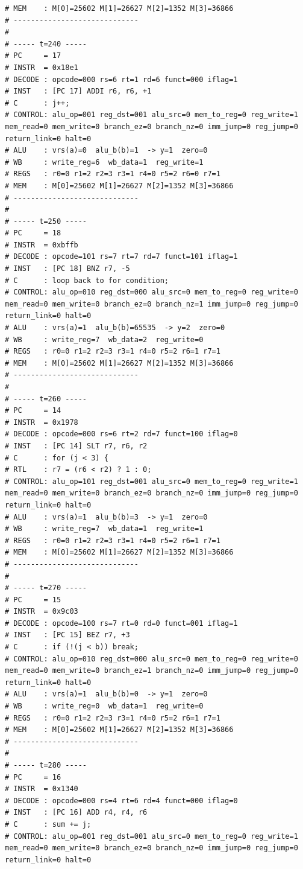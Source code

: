 \documentclass[12pt]{report}
\begin{document}
\begin{lstlisting}
# MEM    : M[0]=25602 M[1]=26627 M[2]=1352 M[3]=36866
# -----------------------------
# 
# ----- t=240 -----
# PC     = 17
# INSTR  = 0x18e1
# DECODE : opcode=000 rs=6 rt=1 rd=6 funct=000 iflag=1
# INST   : [PC 17] ADDI r6, r6, +1
# C      : j++;
# CONTROL: alu_op=001 reg_dst=001 alu_src=0 mem_to_reg=0 reg_write=1 mem_read=0 mem_write=0 branch_ez=0 branch_nz=0 imm_jump=0 reg_jump=0 return_link=0 halt=0
# ALU    : vrs(a)=0  alu_b(b)=1  -> y=1  zero=0
# WB     : write_reg=6  wb_data=1  reg_write=1
# REGS   : r0=0 r1=2 r2=3 r3=1 r4=0 r5=2 r6=0 r7=1
# MEM    : M[0]=25602 M[1]=26627 M[2]=1352 M[3]=36866
# -----------------------------
# 
# ----- t=250 -----
# PC     = 18
# INSTR  = 0xbffb
# DECODE : opcode=101 rs=7 rt=7 rd=7 funct=101 iflag=1
# INST   : [PC 18] BNZ r7, -5
# C      : loop back to for condition;
# CONTROL: alu_op=010 reg_dst=000 alu_src=0 mem_to_reg=0 reg_write=0 mem_read=0 mem_write=0 branch_ez=0 branch_nz=1 imm_jump=0 reg_jump=0 return_link=0 halt=0
# ALU    : vrs(a)=1  alu_b(b)=65535  -> y=2  zero=0
# WB     : write_reg=7  wb_data=2  reg_write=0
# REGS   : r0=0 r1=2 r2=3 r3=1 r4=0 r5=2 r6=1 r7=1
# MEM    : M[0]=25602 M[1]=26627 M[2]=1352 M[3]=36866
# -----------------------------
# 
# ----- t=260 -----
# PC     = 14
# INSTR  = 0x1978
# DECODE : opcode=000 rs=6 rt=2 rd=7 funct=100 iflag=0
# INST   : [PC 14] SLT r7, r6, r2
# C      : for (j < 3) {
# RTL    : r7 = (r6 < r2) ? 1 : 0;
# CONTROL: alu_op=101 reg_dst=001 alu_src=0 mem_to_reg=0 reg_write=1 mem_read=0 mem_write=0 branch_ez=0 branch_nz=0 imm_jump=0 reg_jump=0 return_link=0 halt=0
# ALU    : vrs(a)=1  alu_b(b)=3  -> y=1  zero=0
# WB     : write_reg=7  wb_data=1  reg_write=1
# REGS   : r0=0 r1=2 r2=3 r3=1 r4=0 r5=2 r6=1 r7=1
# MEM    : M[0]=25602 M[1]=26627 M[2]=1352 M[3]=36866
# -----------------------------
# 
# ----- t=270 -----
# PC     = 15
# INSTR  = 0x9c03
# DECODE : opcode=100 rs=7 rt=0 rd=0 funct=001 iflag=1
# INST   : [PC 15] BEZ r7, +3
# C      : if (!(j < b)) break;
# CONTROL: alu_op=010 reg_dst=000 alu_src=0 mem_to_reg=0 reg_write=0 mem_read=0 mem_write=0 branch_ez=1 branch_nz=0 imm_jump=0 reg_jump=0 return_link=0 halt=0
# ALU    : vrs(a)=1  alu_b(b)=0  -> y=1  zero=0
# WB     : write_reg=0  wb_data=1  reg_write=0
# REGS   : r0=0 r1=2 r2=3 r3=1 r4=0 r5=2 r6=1 r7=1
# MEM    : M[0]=25602 M[1]=26627 M[2]=1352 M[3]=36866
# -----------------------------
# 
# ----- t=280 -----
# PC     = 16
# INSTR  = 0x1340
# DECODE : opcode=000 rs=4 rt=6 rd=4 funct=000 iflag=0
# INST   : [PC 16] ADD r4, r4, r6
# C      : sum += j;
# CONTROL: alu_op=001 reg_dst=001 alu_src=0 mem_to_reg=0 reg_write=1 mem_read=0 mem_write=0 branch_ez=0 branch_nz=0 imm_jump=0 reg_jump=0 return_link=0 halt=0

\end{lstlisting}
\end{document}
